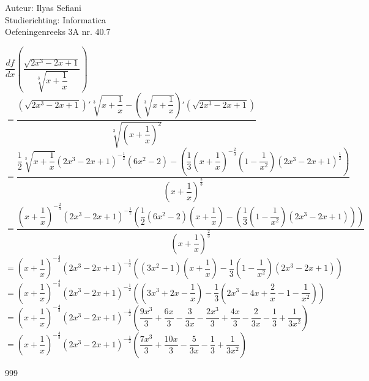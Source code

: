 \documentclass[a4paper]{article}
\begin{document}
\noindent \large Auteur: Ilyas Sefiani \\
\noindent \large Studierichting: Informatica\\
\noindent \large Oefeningenreeks 3A nr. 40.7\\

\medskip

\normalsize

$\dfrac{df}{dx}\left(\dfrac{\sqrt{2x^3-2x+1}}{\sqrt[3]{x+\dfrac{1}{x}}}\right)$\\

$=\dfrac{(\sqrt{2x^3-2x+1})'\sqrt[3]{x+\dfrac{1}{x}}-\left(\sqrt[3]{x+\dfrac{1}{x}}\right)'(\sqrt{2x^3-2x+1})}{\sqrt[3]{\left(x+\dfrac{1}{x}\right)^2}}$\\

$=\dfrac{\dfrac{1}{2}\sqrt[3]{x+\dfrac{1}{x}}(2x^3-2x+1)^{-\tfrac{1}{2}}(6x^2-2)-\left(\dfrac{1}{3}\left(x+\dfrac{1}{x}\right)^{-\tfrac{2}{3}}\left(1-\dfrac{1}{x^2}\right)(2x^3-2x+1)^{\tfrac{1}{2}}\right)}{\left(x+\dfrac{1}{x}\right)^{\tfrac{2}{3}}}$\\

$=\dfrac{\left(x+\dfrac{1}{x}\right)^{-\tfrac{2}{3}}(2x^3-2x+1)^{-\tfrac{1}{2}}\left(\dfrac{1}{2}(6x^2-2)\left(x+\dfrac{1}{x}\right)-\left(\dfrac{1}{3}\left(1-\dfrac{1}{x^2}\right)(2x^3-2x+1)\right)\right)}{\left(x+\dfrac{1}{x}\right)^{\tfrac{2}{3}}}$\\

$=\left(x+\dfrac{1}{x}\right)^{-\tfrac{4}{3}}(2x^3-2x+1)^{-\tfrac{1}{2}}\left((3x^2-1)\left(x+\dfrac{1}{x}\right)-\dfrac{1}{3}\left(1-\dfrac{1}{x^2}\right)(2x^3-2x+1)\right)$\\

$=\left(x+\dfrac{1}{x}\right)^{-\tfrac{4}{3}}(2x^3-2x+1)^{-\tfrac{1}{2}}\left(\left(3x^3+2x-\dfrac{1}{x}\right)-\dfrac{1}{3}\left(2x^3-4x+\dfrac{2}{x}-1-\dfrac{1}{x^2}\right)\right)$\\

$=\left(x+\dfrac{1}{x}\right)^{-\tfrac{4}{3}}(2x^3-2x+1)^{-\tfrac{1}{2}}\left(\dfrac{9x^3}{3}+\dfrac{6x}{3}-\dfrac{3}{3x}-\dfrac{2x^3}{3}+\dfrac{4x}{3}-\dfrac{2}{3x}-\dfrac{1}{3}+\dfrac{1}{3x^2}\right)$\\

$=\left(x+\dfrac{1}{x}\right)^{-\tfrac{4}{3}}(2x^3-2x+1)^{-\tfrac{1}{2}}\left(\dfrac{7x^3}{3}+\dfrac{10x}{3}-\dfrac{5}{3x}-\dfrac{1}{3}+\dfrac{1}{3x^2}\right)$\\


\begin{thebibliography}{999}
\end{thebibliography}
\end{document}
